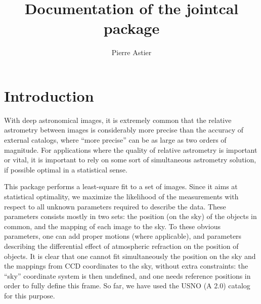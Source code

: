 \documentclass[a4paper,12pt]{scrartcl}
\title{Documentation of the jointcal package}
\author{Pierre Astier}
\affil{LPNHE/IN2P3/CNRS (Paris)}
\begin{document}
\maketitle




\tableofcontents

\section{Introduction}
With deep astronomical images, it is extremely common that
the relative astrometry between images is considerably more precise
than the accuracy of external catalogs, where ``more precise'' can be as large
as two orders of magnitude. For applications where the
quality of relative astrometry is important or vital, it is important
to rely on some sort of simultaneous astrometry solution, if possible
optimal in a statistical sense. 

This package performs a least-square fit to a set of images.
Since it aims at statistical optimality, we maximize 
the likelihood of the measurements with respect to all 
unknown parameters required to describe the data.
These parameters consists mostly in two sets: the position
(on the sky) of the objects in common, and the mapping
of each image to the sky. To these obvious parameters,
one can add proper motions (where applicable), and 
parameters describing the differential effect of atmospheric refraction
on the position of objects. It is clear that one cannot
fit simultaneously the position on the sky and the mappings
from CCD coordinates to the sky, without extra constraints:
the ``sky'' coordinate system is then undefined, and one needs
reference positions in order to fully define this frame.
So far, we have used the USNO (A 2.0) catalog for this purpose.
\end{document}
